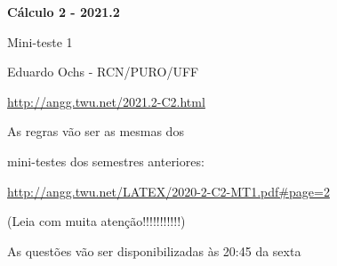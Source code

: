 \documentclass[oneside,12pt]{article}
\begin{document}



\def\drafturl{http://angg.twu.net/LATEX/2021-2-C2.pdf}
\def\drafturl{http://angg.twu.net/2021.2-C2.html}
\def\draftfooter{\tiny \href{\drafturl}{\jobname{}} \ColorBrown{\shorttoday{} \hours}}



%

\thispagestyle{empty}

\begin{center}

\vspace*{1.2cm}

{\bf \Large Cálculo 2 - 2021.2}

\bsk

Mini-teste 1

\bsk

Eduardo Ochs - RCN/PURO/UFF

\url{http://angg.twu.net/2021.2-C2.html}

\end{center}

\newpage


As regras vão ser as mesmas dos

mini-testes dos semestres anteriores:

\ssk

{\footnotesize

\url{http://angg.twu.net/LATEX/2020-2-C2-MT1.pdf#page=2}

}

(Leia com muita atenção!!!!!!!!!!!)

\bsk

As questões vão ser disponibilizadas às 20:45 da sexta
\end{document}
